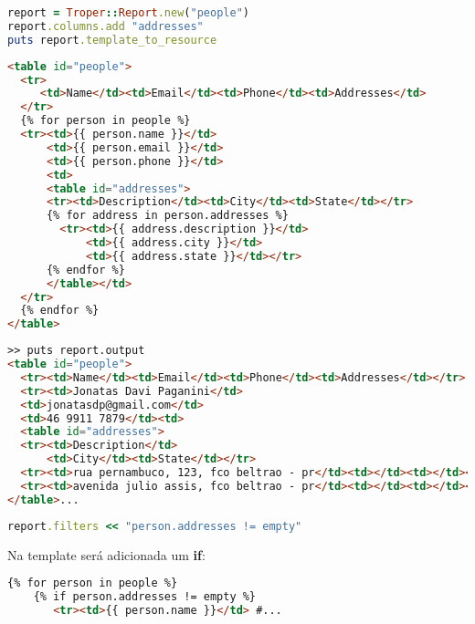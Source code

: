 \documentclass{beamer}
\begin{document}
\begin{frame}[fragile]
\begin{lstlisting}[language=ruby, caption=Usando o Troper]
report = Troper::Report.new("people")
report.columns.add "addresses"
puts report.template_to_resource
\end{lstlisting}
\begin{lstlisting}[language=html, caption=Resultado do puts anterior]
<table id="people">
  <tr>
     <td>Name</td><td>Email</td><td>Phone</td><td>Addresses</td>
  </tr>
  {% for person in people %}
  <tr><td>{{ person.name }}</td>
      <td>{{ person.email }}</td>
      <td>{{ person.phone }}</td>
      <td>
      <table id="addresses">
      <tr><td>Description</td><td>City</td><td>State</td></tr>
      {% for address in person.addresses %}
        <tr><td>{{ address.description }}</td>
            <td>{{ address.city }}</td>
            <td>{{ address.state }}</td></tr>
      {% endfor %}
      </table></td>
  </tr>
  {% endfor %}
</table>
\end{lstlisting}
\end{frame}

\begin{frame}[fragile]
\begin{lstlisting}[language=html, caption=Executando o relatório]
>> puts report.output
<table id="people">
  <tr><td>Name</td><td>Email</td><td>Phone</td><td>Addresses</td></tr>
  <tr><td>Jonatas Davi Paganini</td>
  <td>jonatasdp@gmail.com</td>
  <td>46 9911 7879</td><td>
  <table id="addresses">
  <tr><td>Description</td>
      <td>City</td><td>State</td></tr>
  <tr><td>rua pernambuco, 123, fco beltrao - pr</td><td></td><td></td></tr>
  <tr><td>avenida julio assis, fco beltrao - pr</td><td></td><td></td></tr>
</table>...
\end{lstlisting}
\end{frame}

\begin{frame}[fragile]
\begin{lstlisting}[language=ruby, caption=Adicionando filtros]
report.filters << "person.addresses != empty"
\end{lstlisting}

Na template será adicionada um \textbf{if}:

\begin{lstlisting}[language=html, caption=Exibindo na template]
  {% for person in people %}
    {% if person.addresses != empty %}
       <tr><td>{{ person.name }}</td> #...
\end{lstlisting}
\end{frame}
\end{document}
